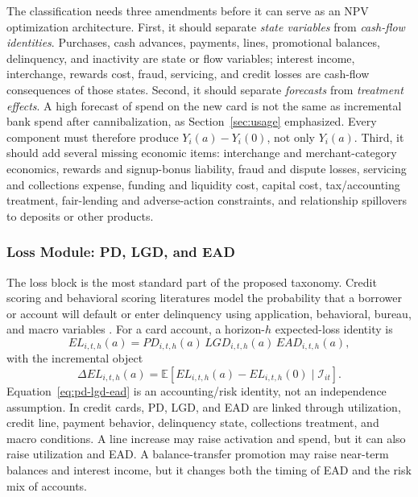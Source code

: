 \documentclass[11pt]{article}
\newcommand{\E}{\mathbb{E}}
\newcommand{\1}{\mathbf{1}}
\begin{document}
The classification needs three amendments before it can serve as an NPV
optimization architecture. First, it should separate \emph{state variables} from
\emph{cash-flow identities}. Purchases, cash advances, payments, lines,
promotional balances, delinquency, and inactivity are state or flow variables;
interest income, interchange, rewards cost, fraud, servicing, and credit losses
are cash-flow consequences of those states. Second, it should separate
\emph{forecasts} from \emph{treatment effects}. A high forecast of spend on the
new card is not the same as incremental bank spend after cannibalization, as
Section~\ref{sec:usage} emphasized. Every component must therefore produce
$Y_i(a)-Y_i(0)$, not only $Y_i(a)$. Third, it should add several missing
economic items: interchange and merchant-category economics, rewards and
signup-bonus liability, fraud and dispute losses, servicing and collections
expense, funding and liquidity cost, capital cost, tax/accounting treatment,
fair-lending and adverse-action constraints, and relationship spillovers to
deposits or other products.

\subsubsection{Loss Module: PD, LGD, and EAD}
\label{subsec:loss-module}

The loss block is the most standard part of the proposed taxonomy. Credit
scoring and behavioral scoring literatures model the probability that a
borrower or account will default or enter delinquency using application,
behavioral, bureau, and macro variables \citep{hand1997credit,thomas2000survey,lessmann2015benchmarking}.
For a card account, a horizon-$h$ expected-loss identity is
\begin{equation}
  EL_{i,t,h}(a)
  =
  PD_{i,t,h}(a)\,
  LGD_{i,t,h}(a)\,
  EAD_{i,t,h}(a),
  \label{eq:pd-lgd-ead}
\end{equation}
with the incremental object
\begin{equation}
  \Delta EL_{i,t,h}(a)
  =
  \E\!\left[
    EL_{i,t,h}(a)-EL_{i,t,h}(0)
    \mid \mathcal{I}_{it}
  \right].
  \label{eq:incremental-el}
\end{equation}
Equation~\eqref{eq:pd-lgd-ead} is an accounting/risk identity, not an
independence assumption. In credit cards, PD, LGD, and EAD are linked through
utilization, credit line, payment behavior, delinquency state, collections
treatment, and macro conditions. A line increase may raise activation and spend,
but it can also raise utilization and EAD. A balance-transfer promotion may
raise near-term balances and interest income, but it changes both the timing of
EAD and the risk mix of accounts.
\end{document}
